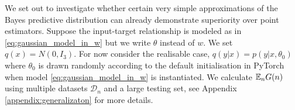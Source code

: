 \documentclass{article} %
\begin{document}
We set out to investigate whether certain very simple approximations of the Bayes predictive distribution can already demonstrate superiority over point estimators. 
Suppose the input-target relationship is modeled as in \ref{eq:gaussian_model_in_w} but we write $\theta$ instead of $w$.
We set $q(x) = N(0,I_3)$. 
For now consider the realisable case, $q(y|x) = p(y|x,\theta_0)$ where $\theta_0$ is drawn randomly according to the default initialisation in PyTorch when model  \ref{eq:gaussian_model_in_w}  is instantiated. We calculate $\mathbb{E}_n G(n)$ using multiple datasets $\mathcal D_n$ and a large testing set, see Appendix \ref{appendix:generalizaton} for more details. 
\end{document}
